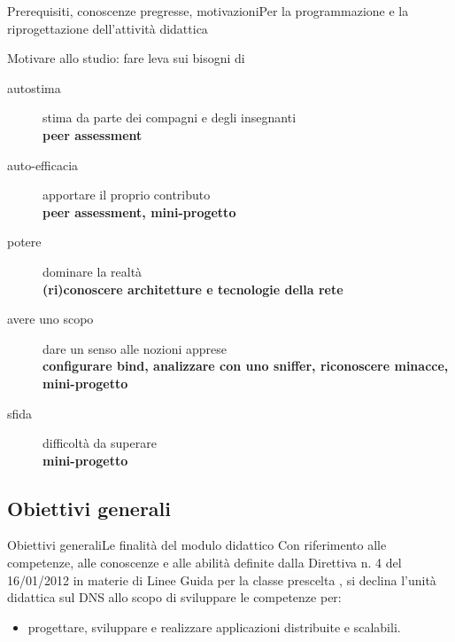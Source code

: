 \documentclass[italian]{beamer}
\begin{document}
\begin{frame}[allowframebreaks]{Prerequisiti, conoscenze pregresse, motivazioni}{Per la programmazione e la riprogettazione dell'attivit\`a didattica}
		
	\begin{block}{Motivare allo studio: fare leva sui bisogni di}
		\begin{description}
			\item[autostima] stima da parte dei compagni e degli insegnanti\\\hfill\textbf{peer assessment}
			\item[auto-efficacia] apportare il proprio contributo\\\hfill\textbf{peer assessment, mini-progetto}
			\item[potere] dominare la realt\`a\\\hfill\textbf{(ri)conoscere architetture e tecnologie della rete}
			\item[avere uno scopo] dare un senso alle nozioni apprese\\\hfill\textbf{configurare bind, analizzare con uno sniffer, riconoscere minacce, mini-progetto}
			\item[sfida] difficolt\`a da superare\\\hfill\textbf{mini-progetto}
		\end{description}
	\end{block}
\end{frame}

\subsection[Finalit\`a]{Obiettivi generali}
\begin{frame}{Obiettivi generali}{Le finalit\`a del modulo didattico}
	Con riferimento alle competenze, alle conoscenze e alle abilit\`a definite dalla Direttiva n. 4 del 16/01/2012 in materie di Linee Guida per la classe prescelta \hyperlink{dir:16012012}{}, si declina l'unit\`a didattica sul DNS allo scopo di sviluppare le competenze per:
	
	\begin{itemize}
		\item \alert{progettare, sviluppare e realizzare applicazioni distribuite e scalabili.}
	\end{itemize}
	
	\note{%
		
	}%
\end{frame}
\end{document}
